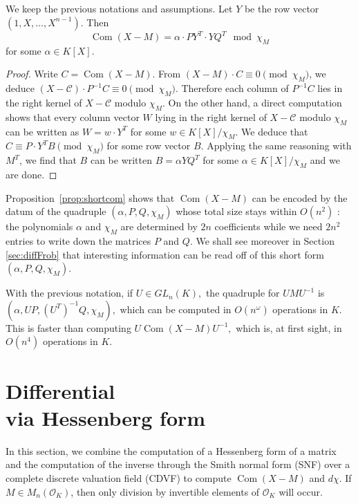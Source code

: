 \documentclass{sig-alternate-05-2015}
\DeclareMathOperator{\com}{Com}
\newcommand{\OK}{\mathcal{O}_K}
\begin{document}
\begin{prop}
\label{prop:shortcom}
We keep the previous notations and assumptions.
Let $Y$ be the row vector $(1, X, \ldots, X^{n-1})$. Then
\begin{equation}
\label{eq:shortcom}
\com(X{-}M) = \alpha \cdot P Y^T \cdot Y Q^T
\mod \chi_M
\end{equation}
for some $\alpha \in K[X]$.
\end{prop}

\begin{proof}
Write $C = \com(X{-}M)$. From $(X{-}M) \cdot C \equiv 0 
\pmod{\chi_M}$, we deduce $(X{-}\mathscr{C}) \cdot P^{-1} C \equiv 0 \pmod{\chi_M}$. 
Therefore each column of $P^{-1} C$ lies in the right kernel of $X{-}\mathscr{C}$
modulo $\chi_M$. On the other hand, a direct computation shows that
every column vector $W$ lying in the right kernel of $X{-}\mathscr{C}$ modulo 
$\chi_M$ can be written as $W = w \cdot Y^T$ for some $w \in 
K[X]/\chi_M$. We deduce that $C \equiv P \cdot Y^T B \pmod{\chi_M}$
for some row vector $B$.
Applying the same reasoning with $M^T$, we find that $B$ can be
written $B = \alpha Y Q^T$ for some $\alpha \in K[X]/\chi_M$ and
we are done.
\end{proof}

Proposition~\ref{prop:shortcom} shows that $\com(X{-}M)$ can be encoded 
by the datum of the quadruple $(\alpha, P, Q, \chi_M)$ whose total size 
stays within $O(n^2)$ : the polynomials $\alpha$ and $\chi_M$ are 
determined by $2n$ coefficients while we need $2n^2$ entries to 
write down the matrices $P$ and $Q$. 
We shall see moreover in Section \ref{sec:diffFrob} that interesting
information can be read off of this short form $(\alpha, P, Q, 
\chi_M)$.

\begin{rem}
With the previous notation, if $U \in GL_n(K),$
the quadruple for 
$UMU^{-1}$ is
$(\alpha, UP, (U^T)^{-1}Q, \chi_M),$
which can be computed in $O(n^\omega)$ operations in $K.$
This is faster than computing $U \com(X-M) U^{-1},$
which is, at first sight, in $O(n^4)$ operations in $K.$
\end{rem}

\section{Differential\\via Hessenberg form}
\label{sec:diffHess}

In this section, we combine the computation of a Hessenberg form
of a matrix and the computation of the inverse through the Smith normal form (SNF)
over a complete discrete valuation field (CDVF)
to compute $\com(X-M)$ and $d \chi$.
If $M \in M_n(\OK)$, then only division by invertible
elements of $\OK$ will occur.
\end{document}
